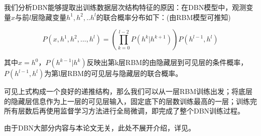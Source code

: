 我们分析DBN能够提取出训练数据层次结构特征的原因：在DBN模型中，观测变量$x$与前$l$层隐藏变量$h^1,h^2,..h^l$的联合概率分布如下：(由RBM模型可推知)

\begin{equation}
P(x,h^1,h^2,...,h^l) = (\prod^{l-2}_{k=0} P(h^k|h^{k+1})) P(h^{l-1},h^l)
\end{equation}

其中$x=h^0$，$P(h^{k-1}|h^k)$反映出第k层RBM的由隐藏层到可见层的条件概率，$P(h^{l-1},h^l)$为第l层RBM的可见层与隐藏层的联合概率。

可见上式构成一个良好的递推结构，那么我们可以从一层RBM训练出发；将底层的隐藏层信息作为上一层的可见层输入，固定底下的层数训练最高的一层；训练完所有层数后再使用监督学习方法进行全局微调，即完成了整个DBN训练过程。

由于DBN大部分内容与本论文无关，此处不展开介绍，详见\cite{lee2009convolutional}。